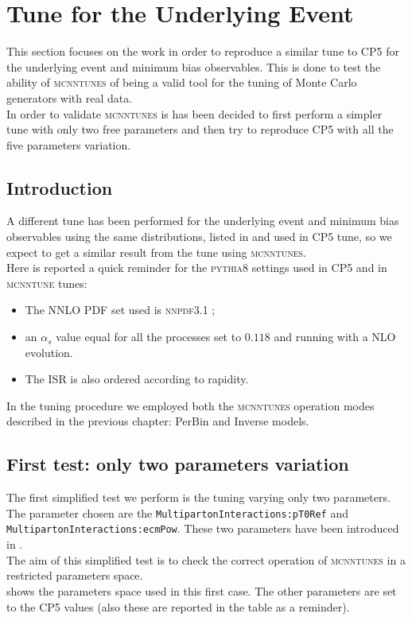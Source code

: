 \chapter{Tune for the Underlying Event}
\label{chap:OurTunefortheUnderlyingEvent}

This section focuses on the work in order to reproduce a similar tune to CP5 for the underlying event and minimum bias observables. This is done to test the ability of \textsc{mcnntunes} of being a valid tool for the tuning of Monte Carlo generators with real data. 
\\
In order to validate \textsc{mcnntunes} is has been decided to first perform a simpler tune with only two free parameters and then try to reproduce CP5 \cite{CPtunes} with all the five parameters variation.


\section{Introduction}

A different tune has been performed for the underlying event and minimum bias observables using the same distributions, listed in  and used in CP5 tune, so we expect to get a similar result from the tune using  \textsc{mcnntunes}.
\\
Here is reported a quick reminder for the \textsc{pythia8} settings used in CP5 and in \textsc{mcnntune} tunes:
\begin{itemize}
	\item The NNLO PDF set used is \textsc{nnpdf}3.1 \cite{NNPDF:2017mvq}; 
	\item an $\alpha_s$ value equal for all the processes set to $0.118$ and running with a NLO evolution.
	\item The ISR is also ordered according to rapidity.
\end{itemize}
In the tuning procedure we employed both the \textsc{mcnntunes} operation modes described in the previous chapter: PerBin and Inverse models.

\section{First test: only two parameters variation}

The first simplified test we perform is the tuning varying only two parameters. The parameter chosen are the \texttt{Multiparton}\-\texttt{Interactions:}\-\texttt{pT0Ref} and 
\texttt{Multiparton}\-\texttt{Interactions:}\-\texttt{ecmPow}. These two parameters have been introduced in .
\\
The aim of this simplified test is to check the correct operation of \textsc{mcnntunes}  in a restricted parameters space.%
\\
 shows the parameters space used in this first case. The other parameters are set to the CP5 values (also these are reported in the table as a reminder).


